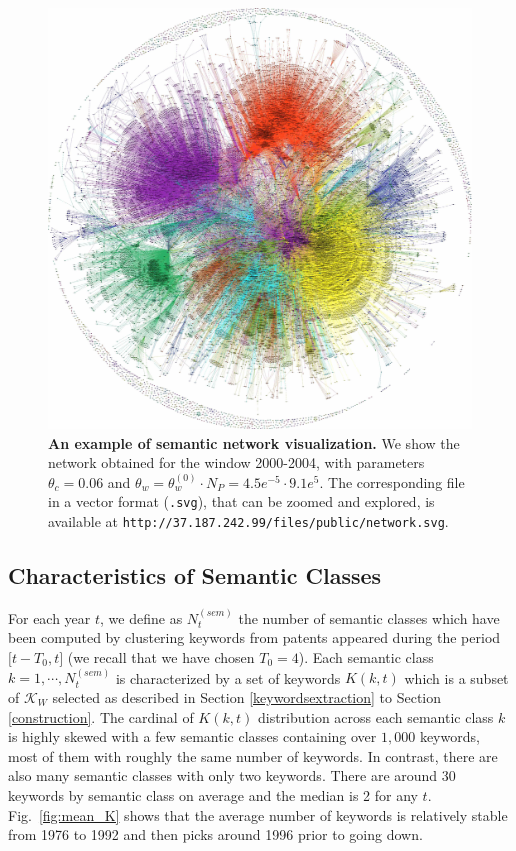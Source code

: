 \documentclass[12pt,twoside,a4paper]{article}
\begin{document}
\begin{figure}
\centering
\includegraphics[width=\textwidth]{striking}
\caption{\textbf{An example of semantic network visualization.} We show the network obtained for the window 2000-2004, with parameters $\theta_c = 0.06$ and $\theta_w = \theta_w^{(0)}\cdot N_P = 4.5e^{-5} \cdot 9.1e^{5}$. The corresponding file in a vector format (\texttt{.svg}), that can be zoomed and explored, is available at \texttt{http://37.187.242.99/files/public/network.svg}.}
\label{fig:rawnetwork}
\end{figure}



\subsection{Characteristics of Semantic Classes}
\label{characteristics}
For each year $t$, we define as $N^{(sem)}_t$ the number of semantic classes which have been computed by clustering keywords from patents appeared during the period $\big[ t-T_0, t \big]$ (we recall that we have chosen $T_0=4$). Each semantic class $k =  1, \cdots, N^{(sem)}_t$ is characterized by a set of keywords $K(k,t)$ which is a subset of $\mathcal{K}_W$ selected as described in Section \ref{keywordsextraction} to Section \ref{construction}. The cardinal of $K(k, t)$ distribution across each semantic class $k$ is highly skewed with a few semantic classes containing over $1,000$ keywords, most of them with roughly the same number of keywords. In contrast, there are also many semantic classes with only two keywords. There are around 30 keywords by semantic class on average and the median is 2 for any $t$. Fig.~\ref{fig:mean_K} shows that the average number of keywords is relatively stable from 1976 to 1992 and then picks around 1996 prior to going down.
\end{document}

